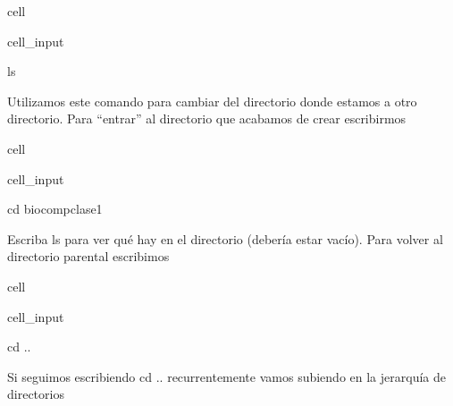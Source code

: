 \documentclass[letterpaper,10pt,english]{jupyterBook}
\begin{document}
\begin{sphinxuseclass}{cell}\begin{sphinxVerbatimInput}

\begin{sphinxuseclass}{cell_input}
\begin{sphinxVerbatim}[commandchars=\\\{\}]
\PYGZdl{} ls
\end{sphinxVerbatim}

\end{sphinxuseclass}\end{sphinxVerbatimInput}

\end{sphinxuseclass}


\begin{DUlineblock}{0em}
\item[] 
\end{DUlineblock}

\begin{DUlineblock}{0em}
\item[] 
\end{DUlineblock}

\sphinxAtStartPar
Utilizamos este comando para cambiar del directorio donde estamos a otro directorio. Para “entrar” al directorio que acabamos de crear escribirmos

\begin{sphinxuseclass}{cell}\begin{sphinxVerbatimInput}

\begin{sphinxuseclass}{cell_input}
\begin{sphinxVerbatim}[commandchars=\\\{\}]
\PYGZdl{} cd biocomp\PYGZus{}clase1
\end{sphinxVerbatim}

\end{sphinxuseclass}\end{sphinxVerbatimInput}

\end{sphinxuseclass}
\sphinxAtStartPar
Escriba ls para ver qué hay en el directorio (debería estar vacío).
Para volver al directorio parental escribimos

\begin{sphinxuseclass}{cell}\begin{sphinxVerbatimInput}

\begin{sphinxuseclass}{cell_input}
\begin{sphinxVerbatim}[commandchars=\\\{\}]
\PYGZdl{} cd ..
\end{sphinxVerbatim}

\end{sphinxuseclass}\end{sphinxVerbatimInput}

\end{sphinxuseclass}
\sphinxAtStartPar
Si seguimos escribiendo  cd ..   recurrentemente vamos subiendo en la jerarquía de directorios
\end{document}
